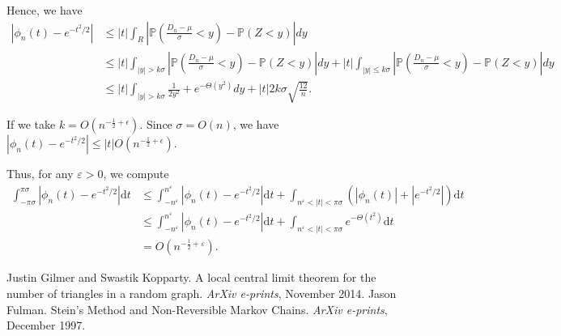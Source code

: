\documentclass{article}
\newcommand{\f}[2]{\frac{#1}{#2}}
\newcommand{\abs}[1]{\left\lvert#1\right\rvert}
\renewcommand{\P}{\mathbb{P}}
\renewcommand{\d}{\mathrm{d}}
\newcommand{\eps}{\varepsilon}
\begin{document}
Hence, we have
\begin{align}
\abs{\phi_n(t) - e^{-t^2/2}} &\leq \abs{t} \int_R \abs{\P(\f{D_n - \mu}{\sigma} < y) - \P(Z < y)} dy  \\
&\leq |t| \int_{|y|>k\sigma} \abs{\P(\f{D_n - \mu}{\sigma} < y) - \P(Z < y)} dy + |t| \int_{|y| \leq k\sigma}  \abs{\P(\f{D_n - \mu}{\sigma} < y) - \P(Z < y)} dy \\
&\leq |t| \int_{|y|>k\sigma} \frac{1}{2y^2} + e^{-\Theta(y^2)} dy + |t|2k\sigma \sqrt{\frac{12}{n}}.
\end{align}

If we take $k = O(n^{-\frac{1}{2} + \epsilon})$. Since $\sigma = O(n)$, we have $\abs{\phi_n(t) - e^{-t^2/2}} \leq |t|O(n^{-\frac{1}{2} + \epsilon})$.

	Thus, for any $\eps > 0$, we compute
	\begin{align*}
		\int_{-\pi \sigma}^{\pi \sigma} \abs{\phi_n(t) - e^{-t^2/2}} \d t
		&\leq \int_{-n^\eps}^{n^\eps} \abs{\phi_n(t) - e^{-t^2/2}} \d t + \int_{n^\eps < \abs{t} < \pi \sigma} (\abs{\phi_n(t)} + |e^{-t^2/2}|) \d t \\
		&\leq \int_{-n^\eps}^{n^\eps} \abs{\phi_n(t) - e^{-t^2/2}} \d t + \int_{n^\eps < \abs{t} < \pi \sigma} e^{-\Theta(t^2)} \d t \\
		&= O(n^{-\f{1}{2} + \eps}).
	\end{align*}








	\begin{thebibliography}{0}
			Justin Gilmer and Swastik Kopparty.
			A local central limit theorem for the number of triangles in a random graph.
			\emph{ArXiv e-prints},
			November 2014.
			Jason Fulman.
			Stein's Method and Non-Reversible Markov Chains.
			\emph{ArXiv e-prints},
			December 1997.
	\end{thebibliography}
\end{document}
